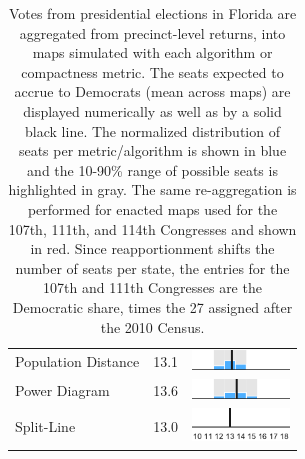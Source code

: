 \begin{table}
\begin{tabular}{l rm{7em}}
Population Distance    &  13.1 &       \includegraphics[width=7em]{mini_hist/FL_2008_dist_p} \\
Power Diagram          &  13.6 &        \includegraphics[width=7em]{mini_hist/FL_2008_power} \\
Split-Line             &  13.0 &        \includegraphics[width=7em]{mini_hist/FL_2008_split_ax} \\
\hline \hline
\end{tabular}
\caption{Votes from presidential elections in Florida are aggregated from precinct-level returns, into maps simulated with each algorithm or compactness metric. 
             The seats expected to accrue to Democrats (mean across maps) are displayed numerically as well as by a solid black line.
             The normalized distribution of seats per metric/algorithm is shown in blue and the 10-90\% range of possible seats is highlighted in gray.
             The same re-aggregation is performed for enacted maps used for the 107th, 111th, and 114th Congresses and shown in red.
             Since reapportionment shifts the number of seats per state,
               the entries for the 107th and 111th Congresses are the Democratic share,
               times the 27 assigned after the 2010 Census.
             }\label{tab:FL_seats}
\end{table}
 